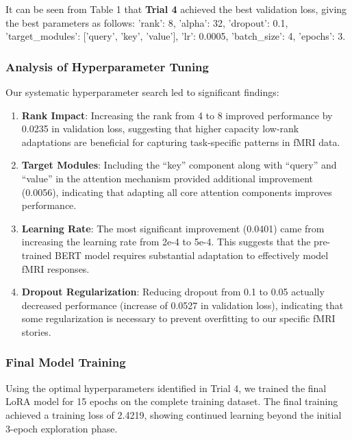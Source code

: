 \documentclass[12pt,letterpaper]{article}
\begin{document}
It can be seen from Table 1 that \textbf{Trial 4} achieved the best validation loss, giving the best parameters as follows: 'rank': 8, 'alpha': 32, 'dropout': 0.1, 'target\_modules': ['query', 'key', 'value'], 'lr': 0.0005, 'batch\_size': 4, 'epochs': 3.


\subsubsection{Analysis of Hyperparameter Tuning}

Our systematic hyperparameter search led to significant findings:

\begin{enumerate}
    \item \textbf{Rank Impact}: Increasing the rank from 4 to 8 improved performance by 0.0235 in validation loss, suggesting that higher capacity low-rank adaptations are beneficial for capturing task-specific patterns in fMRI data.
    
    \item \textbf{Target Modules}: Including the ``key'' component along with ``query'' and ``value'' in the attention mechanism provided additional improvement (0.0056), indicating that adapting all core attention components improves performance.
    
    \item \textbf{Learning Rate}: The most significant improvement (0.0401) came from increasing the learning rate from 2e-4 to 5e-4. This suggests that the pre-trained BERT model requires substantial adaptation to effectively model fMRI responses.
    
    \item \textbf{Dropout Regularization}: Reducing dropout from 0.1 to 0.05 actually decreased performance (increase of 0.0527 in validation loss), indicating that some regularization is necessary to prevent overfitting to our specific fMRI stories.
\end{enumerate}

\subsubsection{Final Model Training}

Using the optimal hyperparameters identified in Trial 4, we trained the final LoRA model for 15 epochs on the complete training dataset. The final training achieved a training loss of 2.4219, showing continued learning beyond the initial 3-epoch exploration phase.
\end{document}

